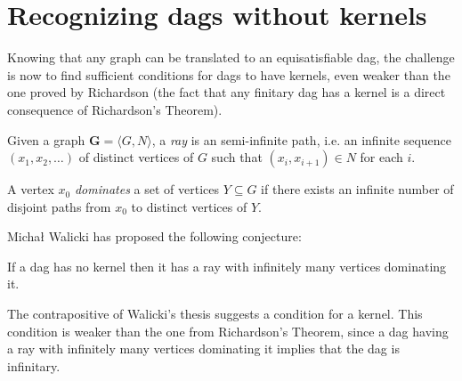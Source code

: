 
\section{Recognizing dags without kernels}
\label{sec:Recognizing dags without kernels}
Knowing that any graph can be translated to an equisatisfiable dag, the challenge is now to find sufficient conditions for dags to have kernels, even weaker than the one proved by Richardson (the fact that any finitary dag has a kernel is a direct consequence of Richardson's Theorem).
\begin{definition}
  Given a graph $\mathbf{G} = \langle G,N \rangle$, a \textit{ray} is an semi-infinite path, i.e. an infinite sequence $(x_1, x_2, \dots)$ of distinct vertices of $G$ such that $(x_i,x_{i+1}) \in N$ for each $i$.
\end{definition}
\begin{definition}
  A vertex $x_0$ \textit{dominates} a set of vertices $Y \subseteq G$ if there exists an infinite number of disjoint paths from $x_0$ to distinct vertices of $Y$.
\end{definition}
Michał Walicki has proposed the following conjecture:
\begin{conjecture}
  If a dag has no kernel then it has a ray with infinitely many vertices dominating it.
\end{conjecture}
The contrapositive of Walicki's thesis suggests a condition for a kernel.
This condition is weaker than the one from Richardson's Theorem, since a dag having a ray with infinitely many vertices dominating it implies that the dag is infinitary.
